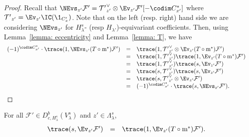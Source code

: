 \documentclass[11pt,letterpaper]{amsart}
\newcommand{\calm}{\textrm{m}}
\numberwithin{equation}{section}
\begin{document}
\begin{proof}
Recall that  $\NEvs_{z'}\mathcal{F'} = \mathcal{T'}_{z'}^{\vee} \otimes \Ev_{z'} \mathcal{F'}[-\codim C_{x'}^*]$
where 
$\mathcal{T'}_{z'} = \Ev_{z'}\IC(\1_{C_x'})$.
Note that on the left (resp. right)  hand side 
we are considering $\NEvs_{z'}$ for $H_\lambda^s $-
(resp $H_{\lambda'}$)-equivariant coefficients.
Then, using Lemma~\ref{lemma: eccentricity} and
Lemma~\ref{lemma: T}, we have
\[
\begin{array}{rcl} (-1)^{\codim C_{x'}^*}\cdot 
\trace(1,\NEvs_{z'}(T\circ\calm^*)\mathcal{F'})
&=&
\trace(1,\mathcal{T'}_{z'}^{\vee} \otimes \Ev_{z'}(T\circ\calm^*)\mathcal{F'})\\
&=&
\trace(1,\mathcal{T'}_{z'}^{\vee}) \trace(1,\Ev_{z'}(T\circ\calm^*)\mathcal{F'})\\
&=&
\trace(1,\mathcal{T'}_{z'}^{\vee}) \trace(s,\Ev_{z'}\mathcal{F'})\\
&=&
\trace(s,\mathcal{T'}_{z'}^{\vee}) \trace(s,\Ev_{z'}\mathcal{F'})\\
&=&
\trace(s,\mathcal{T'}_{z'}^{\vee}\otimes \Ev_{z'}\mathcal{F'})\\
&=&
(-1)^{\codim C_{x'}^*}\cdot \trace(s,\NEvs_{z'}\mathcal{F'}).
\end{array}
\]
\end{proof}


\begin{lemma}\label{lemma: T}
For all $\mathcal{F'}\in D^b_{c,H_\lambda^s}(V_\lambda^s)$ and $z'\in \Lambda_\lambda^s$,
\[
\begin{array}{rcl}
\trace(s,\Ev_{z'}  \mathcal{F'})
&=& 
\trace(1,\Ev_{z'}(T\circ\calm^*)\mathcal{F'}).
\end{array}
\]
\end{lemma}
\end{document}
